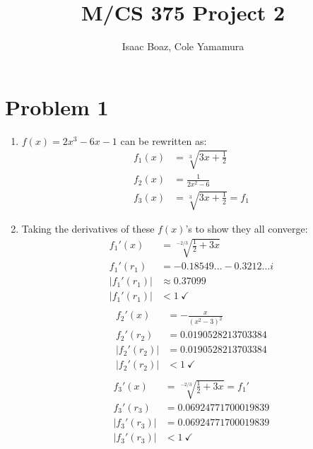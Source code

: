 \documentclass{article}
\title{\vspace{-5ex}M/CS 375 Project 2}
\author{Isaac Boaz, Cole Yamamura}
\begin{document}
\maketitle

\section*{Problem 1}
\begin{enumerate}[label=(\alph*)]
    \item \(f(x) = 2x^3 - 6x - 1\) can be rewritten as:
        \begin{align*}
            f_1(x) & = \sqrt[3]{3x+\frac{1}{2}} \\
            f_2(x) & = \frac{1}{2x^2-6}  \\
            f_3(x) & = \sqrt[3]{3x+\frac{1}{2}} = f_1
        \end{align*}
    \item Taking the derivatives of these \(f(x)\)'s to show they all converge:
        \begin{align*}
            f_1'(x) &= \sqrt[-2/3]{\frac{1}{2} + 3x}\ \\
                    f_1'(r_1) & = -0.18549\ldots - 0.3212\ldots i \\
                    |f_1'(r_1)| & \approx 0.37099 \\
                    |f_1'(r_1)| & < 1\ \checkmark \\
        \end{align*}
        \begin{align*}
            f_2'(x) &= -\frac{x}{(x^2-3)^2} \\
                    f_2'(r_2) & = 0.0190528213703384 \\
                    |f_2'(r_2)| & = 0.0190528213703384 \\
                    |f_2'(r_2)| & < 1\ \checkmark \\
        \end{align*}
        \begin{align*}
            f_3'(x) &= \sqrt[-2/3]{\frac{1}{2} + 3x} = f_1' \\
            f_3'(r_3) &= 0.06924771700019839 \\
            |f_3'(r_3)|& = 0.06924771700019839 \\
            |f_3'(r_3)| &< 1\ \checkmark
        \end{align*}
\end{enumerate}

\pagebreak
\end{document}
